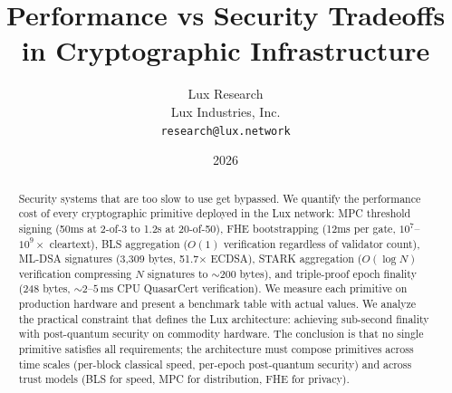 \documentclass[11pt,a4paper]{article}
\title{Performance vs Security Tradeoffs\\in Cryptographic Infrastructure}
\author{
Lux Research \\
Lux Industries, Inc.\\
\texttt{research@lux.network}
}
\date{2026}
\begin{document}
\luxcoverpage

\begin{abstract}
Security systems that are too slow to use get bypassed. We quantify the performance cost of every cryptographic primitive deployed in the Lux network: MPC threshold signing (50ms at 2-of-3 to 1.2s at 20-of-50), FHE bootstrapping (12ms per gate, $10^7$--$10^9\times$ cleartext), BLS aggregation ($O(1)$ verification regardless of validator count), ML-DSA signatures (3,309 bytes, 51.7$\times$ ECDSA), STARK aggregation ($O(\log N)$ verification compressing $N$ signatures to $\sim$200 bytes), and triple-proof epoch finality (248 bytes, ${\sim}2$--$5$\,ms CPU QuasarCert verification). We measure each primitive on production hardware and present a benchmark table with actual values. We analyze the practical constraint that defines the Lux architecture: achieving sub-second finality with post-quantum security on commodity hardware. The conclusion is that no single primitive satisfies all requirements; the architecture must compose primitives across time scales (per-block classical speed, per-epoch post-quantum security) and across trust models (BLS for speed, MPC for distribution, FHE for privacy).
\end{abstract}












\end{document}
